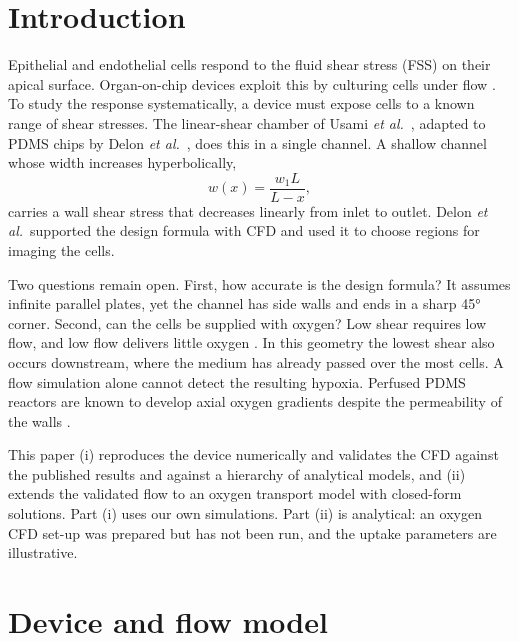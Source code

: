 \documentclass[11pt,a4paper]{article}
\begin{document}
\section{Introduction}

Epithelial and endothelial cells respond to the fluid shear stress (FSS) on their apical surface. Organ-on-chip devices exploit this by culturing cells under flow \citep{BhatiaIngber2014,Zhang2018,Kim2012}. To study the response systematically, a device must expose cells to a known range of shear stresses. The linear-shear chamber of Usami \emph{et al.}~\citep{Usami1993}, adapted to PDMS chips by Delon \emph{et al.}~\citep{Delon2019,Delon2020}, does this in a single channel. A shallow channel whose width increases hyperbolically,
\begin{equation}
w(x)=\frac{w_1L}{L-x},
\label{eq:width}
\end{equation}
carries a wall shear stress that decreases linearly from inlet to outlet. Delon \emph{et al.}\ supported the design formula with CFD and used it to choose regions for imaging the cells.

Two questions remain open. First, how accurate is the design formula? It assumes infinite parallel plates, yet the channel has side walls and ends in a sharp \ang{45} corner. Second, can the cells be supplied with oxygen? Low shear requires low flow, and low flow delivers little oxygen \citep{Place2017,Wagner2011}. In this geometry the lowest shear also occurs downstream, where the medium has already passed over the most cells. A flow simulation alone cannot detect the resulting hypoxia. Perfused PDMS reactors are known to develop axial oxygen gradients despite the permeability of the walls \citep{Mehta2007}.

This paper (i) reproduces the device numerically and validates the CFD against the published results and against a hierarchy of analytical models, and (ii) extends the validated flow to an oxygen transport model with closed-form solutions. Part (i) uses our own simulations. Part (ii) is analytical: an oxygen CFD set-up was prepared but has not been run, and the uptake parameters are illustrative.

\section{Device and flow model}
\end{document}

